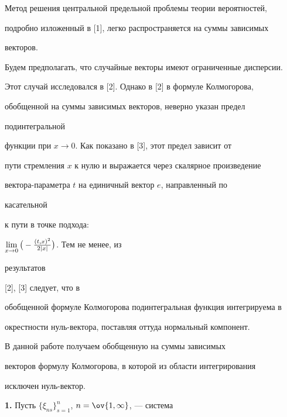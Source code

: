  




\maketitle 


\label{begin} 


 


 


Метод решения центральной предельной проблемы теории вероятностей, 


подробно изложенный в [1], легко распространяется на суммы зависимых 


векторов. 


Будем предполагать, что случайные векторы имеют ограниченные дисперсии. 


Этот случай исследовался в [2]. Однако в [2] в формуле Колмогорова, 


обобщенной на суммы зависимых векторов, неверно указан предел 


подинтегральной 


функции при $x\to 0$. Как показано в [3], этот предел зависит от 


пути стремления $x$ к нулю и выражается через скалярное произведение 


вектора-параметра $t$ на единичный вектор $e$, направленный по 


касательной 


к пути в точке подхода: 


$\lim\limits_{x\to 0}\big(-\frac{(t,x)^2}{2|x|}\big)$. Тем не менее, из 


результатов 


[2], [3] следует, что в 


обобщенной формуле Колмогорова подинтегральная функция интегрируема в 


окрестности нуль-вектора, поставляя оттуда нормальный компонент. 


 


В данной работе получаем обобщенную на суммы зависимых 


векторов формулу Колмогорова, в которой из области интегрирования 


исключен нуль-вектор. 


\medskip 


 


{\bf 1.} Пусть $\{\xi_{ns}\}^n_{s=1}$, $n=\ov{1,\infty}$, --- система 


